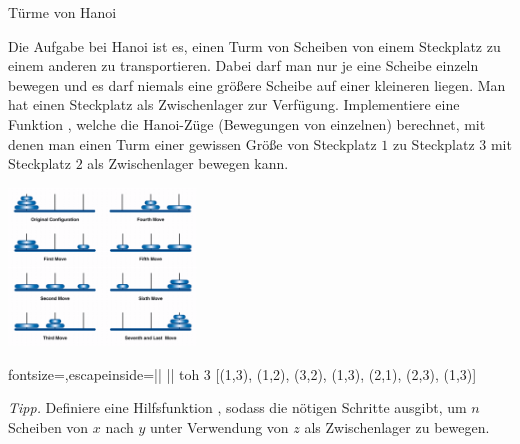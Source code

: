 \documentclass{uebblatt}
\begin{document}
\begin{aufgabe}{Türme von Hanoi}
  \begin{minipage}[m]{0.67 \linewidth}
    Die Aufgabe bei Hanoi ist es, einen Turm von Scheiben von einem Steckplatz zu einem anderen zu transportieren. Dabei darf man nur je eine Scheibe einzeln bewegen und es darf niemals eine größere Scheibe auf einer kleineren liegen. Man hat einen Steckplatz als Zwischenlager zur Verfügung.
    Implementiere eine Funktion , welche die Hanoi-Züge (Bewegungen von einzelnen) berechnet, mit denen man einen Turm einer gewissen Größe von Steckplatz $1$ zu Steckplatz $3$ mit Steckplatz $2$ als Zwischenlager bewegen kann.
  \end{minipage}
  \begin{minipage}{0.32 \linewidth}
    \hfill \includegraphics[width=5cm]{towers-hanoi.png}
  \end{minipage}
  
  \begin{haskellcode*}{fontsize=\small,escapeinside=||}
|\ghci| toh 3
[(1,3), (1,2), (3,2), (1,3), (2,1), (2,3), (1,3)]
  \end{haskellcode*}
  
  {\scriptsize \emph{Tipp.} Definiere eine Hilfsfunktion , sodass  die nötigen Schritte ausgibt, um $n$ Scheiben von $x$ nach $y$ unter Verwendung von $z$ als Zwischenlager zu bewegen.\par}
\end{aufgabe}
\end{document}
